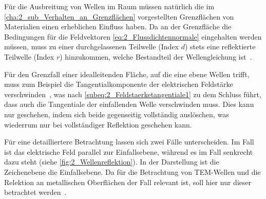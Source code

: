 Für die Ausbreitung von Wellen im Raum müssen natürlich die im \Abschnitt \ref{cha:2_sub_Verhalten_an_Grenzflächen} vorgestellten Grenzflächen von Materialien einen erheblichen Einfluss haben. Da an der Grenzfläche die Bedingungen für die Feldvektoren \Gleichungen \eqref{eq:2_Flussdichtennormale} eingehalten werden müssen, muss zu einer durchgelassenen Teilwelle (Index \glqq$d$\grqq) stets eine reflektierte Teilwelle (Index \glqq$r$\grqq) hinzukommen, welche Bestandteil der Wellengleichung ist~\cite{EM_Schirmung}.
\par
\vspace{\linespace}
Für den Grenzfall einer idealleitenden Fläche, auf die eine ebene Wellen trifft, muss zum Beispiel die Tangentialkomponente der elektrischen Feldstärke verschwinden~\cite{EM_Schirmung}, was nach \Gleichung \eqref{subeq:2_Feldstaerketangentiale1} zu dem Schluss führt, dass auch die Tangentiale der einfallenden Welle verschwinden muss. Dies kann nur geschehen, indem sich beide gegenseitig vollständig auslöschen, was wiederrum nur bei vollständiger Reflektion geschehen kann.
\par
\vspace{\linespace}
Für eine detailliertere Betrachtung lassen sich zwei Fälle unterscheiden. Im Fall  ist das elektrische Feld parallel zur Einfallsebene, während es im Fall  senkrecht dazu steht (siehe \Abb \ref{fig:2_Wellenreflektion}). In der Darstellung ist die Zeichenebene die Einfallsebene. Da für die Betrachtung von TEM-Wellen und die Relektion an metallischen Oberflächen der Fall  relevant ist, soll hier nur dieser betrachtet werden~\cite{EM_Schirmung}.

